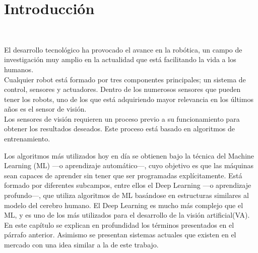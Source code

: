 \chapter{Introducción}
\label{cap:capitulo1}
\setcounter{page}{1}

\begin{flushright}
\begin{minipage}[]{10cm}
\end{minipage}\\

\end{flushright}

\vspace{1cm}

El desarrollo tecnológico ha provocado el avance en la robótica, un campo de investigación muy amplio en la actualidad que está facilitando la vida a los humanos.\\

Cualquier robot está formado por tres componentes principales; un sistema de control, sensores y actuadores. Dentro de los numerosos sensores que pueden tener los robots, uno de los que está adquiriendo mayor relevancia en los últimos años es el sensor de visión.\\

Los sensores de visión requieren un proceso previo a su funcionamiento para obtener los resultados deseados. Este proceso está basado en algoritmos de entrenamiento.

Los algoritmos más utilizados hoy en día se obtienen bajo la técnica del Machine Learning (ML) ---o aprendizaje automático---, cuyo objetivo es que las máquinas sean capaces de aprender sin tener que ser programadas explícitamente. Está formado por diferentes subcampos, entre ellos el Deep Learning ---o aprendizaje profundo---, que utiliza algoritmos de ML basándose en estructuras similares al modelo del cerebro humano. El Deep Learning es mucho más complejo que el ML, y es uno de los más utilizados para el desarrollo de la visión artificial(VA).\\

En este capítulo se explican en profundidad los términos presentados en el párrafo anterior. Asimismo se presentan sistemas actuales que existen en el mercado con una idea similar a la de este trabajo.\\

